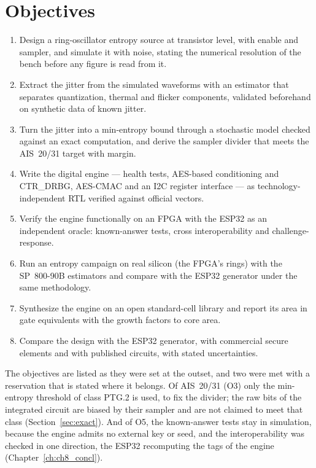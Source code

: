 \section{Objectives}
\label{sec:objectives}

\begin{enumerate}
\item[O1] Design a ring-oscillator entropy source at transistor level,
with enable and sampler, and simulate it with noise, stating the
numerical resolution of the bench before any figure is read from it.
\item[O2] Extract the jitter from the simulated waveforms with an
estimator that separates quantization, thermal and flicker components,
validated beforehand on synthetic data of known jitter.
\item[O3] Turn the jitter into a min-entropy bound through a stochastic
model checked against an exact computation, and derive the sampler
divider that meets the AIS~20/31 target with margin.
\item[O4] Write the digital engine --- health tests, AES-based
conditioning and CTR\_DRBG, AES-CMAC and an I2C register interface --- as
technology-independent RTL verified against official vectors.
\item[O5] Verify the engine functionally on an FPGA with the ESP32 as an
independent oracle: known-answer tests, cross interoperability and
challenge-response.
\item[O6] Run an entropy campaign on real silicon (the FPGA's rings) with
the SP~800-90B estimators and compare with the ESP32 generator under the
same methodology.
\item[O7] Synthesize the engine on an open standard-cell library and
report its area in gate equivalents with the growth factors to core area.
\item[O8] Compare the design with the ESP32 generator, with commercial
secure elements and with published circuits, with stated uncertainties.
\end{enumerate}

The objectives are listed as they were set at the outset, and two were
met with a reservation that is stated where it belongs. Of AIS~20/31
(O3) only the min-entropy threshold of class PTG.2 is used, to fix the
divider; the raw bits of the integrated circuit are biased by their
sampler and are not claimed to meet that class
(Section~\ref{sec:exact}). And of O5, the known-answer tests stay in
simulation, because the engine admits no external key or seed, and the
interoperability was checked in one direction, the ESP32 recomputing the
tags of the engine (Chapter~\ref{ch:ch8_concl}).

